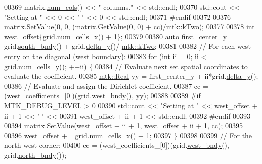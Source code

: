 \begin{DoxyCode}
00369       matrix.\hyperlink{classmtk_1_1DenseMatrix_a41747502d468c6728a4be31501b16e0e}{num\_cols}() << \textcolor{stringliteral}{" columns."} << std::endl;
00370     std::cout << \textcolor{stringliteral}{"Setting at "} << 0 << \textcolor{charliteral}{' '} << 0 << std::endl;
00371 \textcolor{preprocessor}{    #endif}
00372 
00376     matrix.\hyperlink{classmtk_1_1DenseMatrix_a784ce5784109ac86bfb9d8562b334b13}{SetValue}(0, 0, (matrix.\hyperlink{classmtk_1_1DenseMatrix_a4b23ecbebd970b5eea915dbb50691024}{GetValue}(0, 0) + cc)/\hyperlink{group__c01-roots_gaf39c2d851a2db744f4feb1c5ab3ec2cf}{mtk::kTwo});
00377 
00378     \textcolor{keywordtype}{int} west\_offset\{grid.\hyperlink{classmtk_1_1UniStgGrid2D_a2d182866a398aba8e4829590e85bf939}{num\_cells\_x}() + 1\};
00379 
00380     \textcolor{keyword}{auto} first\_center\_y = grid.\hyperlink{classmtk_1_1UniStgGrid2D_a1442eaf219f099d0ebf46a170fdebf92}{south\_bndy}() + grid.\hyperlink{classmtk_1_1UniStgGrid2D_a65a78cfc80ffdbeb282ed57af4dc5cb4}{delta\_y}()/
      \hyperlink{group__c01-roots_gaf39c2d851a2db744f4feb1c5ab3ec2cf}{mtk::kTwo};
00381 
00382     \textcolor{comment}{// For each west entry on the diagonal (west boundary):}
00383     \textcolor{keywordflow}{for} (\textcolor{keywordtype}{int} ii = 0; ii < grid.\hyperlink{classmtk_1_1UniStgGrid2D_aed05a801cc9a76dba0ff203cea58a61a}{num\_cells\_y}(); ++ii) \{
00384       \textcolor{comment}{// Evaluate next set spatial coordinates to evaluate the coefficient.}
00385       \hyperlink{group__c01-roots_gac080bbbf5cbb5502c9f00405f894857d}{mtk::Real} yy = first\_center\_y + ii*grid.\hyperlink{classmtk_1_1UniStgGrid2D_a65a78cfc80ffdbeb282ed57af4dc5cb4}{delta\_y}();
00386       \textcolor{comment}{// Evaluate and assign the Dirichlet coefficient.}
00387       cc = (west\_coefficients\_[0])(grid.\hyperlink{classmtk_1_1UniStgGrid2D_af2b1712387ded85edaf2b64617d3fc13}{west\_bndy}(), yy);
00388 
00389 \textcolor{preprocessor}{      #if MTK\_DEBUG\_LEVEL > 0}
00390       std::cout << \textcolor{stringliteral}{"Setting at "} << west\_offset + ii + 1 << \textcolor{charliteral}{' '} <<
00391         west\_offset + ii + 1 << std::endl;
00392 \textcolor{preprocessor}{      #endif}
00393 
00394       matrix.\hyperlink{classmtk_1_1DenseMatrix_a784ce5784109ac86bfb9d8562b334b13}{SetValue}(west\_offset + ii + 1, west\_offset + ii + 1, cc);
00395 
00396       west\_offset += grid.\hyperlink{classmtk_1_1UniStgGrid2D_a2d182866a398aba8e4829590e85bf939}{num\_cells\_x}() + 1;
00397     \}
00398 
00399     \textcolor{comment}{// For the north-west corner:}
00400     cc = (west\_coefficients\_[0])(grid.\hyperlink{classmtk_1_1UniStgGrid2D_af2b1712387ded85edaf2b64617d3fc13}{west\_bndy}(), grid.\hyperlink{classmtk_1_1UniStgGrid2D_afe1ead253cdeb5503e0489eba8fd84e2}{north\_bndy}());

\end{DoxyCode}
